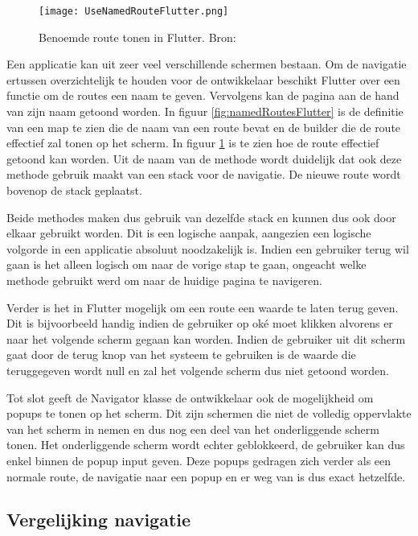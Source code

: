 \begin{figure}
    \texttt{[image: UseNamedRouteFlutter.png]}
    \caption{Benoemde route tonen in Flutter. Bron: \textcite{Flutter.dev2020}}
    \label{fig:useNamedRoutesFlutter}
\end{figure}

Een applicatie kan uit zeer veel verschillende schermen bestaan. Om de navigatie ertussen overzichtelijk te houden voor de ontwikkelaar beschikt Flutter over een functie om de routes een naam te geven. Vervolgens kan de pagina aan de hand van zijn naam getoond worden. In figuur \ref{fig:namedRoutesFlutter} is de definitie van een map te zien die de naam van een route bevat en de builder die de route effectief zal tonen op het scherm. In figuur \ref{fig:useNamedRoutesFlutter} is te zien hoe de route effectief getoond kan worden. Uit de naam van de methode wordt duidelijk dat ook deze methode gebruik maakt van een stack voor de navigatie. De nieuwe route wordt bovenop de stack geplaatst.

Beide methodes maken dus gebruik van dezelfde stack en kunnen dus ook door elkaar gebruikt worden. Dit is een logische aanpak, aangezien een logische volgorde in een applicatie absoluut noodzakelijk is. Indien een gebruiker terug wil gaan is het alleen logisch om naar de vorige stap te gaan, ongeacht welke methode gebruikt werd om naar de huidige pagina te navigeren. 

Verder is het in Flutter mogelijk om een route een waarde te laten terug geven. Dit is bijvoorbeeld handig indien de gebruiker op oké moet klikken alvorens er naar het volgende scherm gegaan kan worden. Indien de gebruiker uit dit scherm gaat door de terug knop van het systeem te gebruiken is de waarde die teruggegeven wordt null en zal het volgende scherm dus niet getoond worden.

Tot slot geeft de Navigator klasse de ontwikkelaar ook de mogelijkheid om popups te tonen op het scherm. Dit zijn schermen die niet de volledig oppervlakte van het scherm in nemen en dus nog een deel van het onderliggende scherm tonen. Het onderliggende scherm wordt echter geblokkeerd, de gebruiker kan dus enkel binnen de popup input geven. Deze popups gedragen zich verder als een normale route, de navigatie naar een popup en er weg van is dus exact hetzelfde.

\subsection{Vergelijking navigatie}
\label{subsubsec:vglNavigatie}

